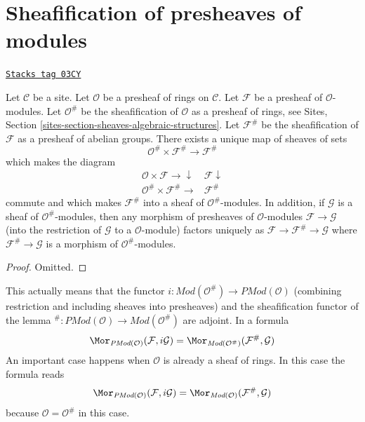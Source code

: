 \section{Sheafification of presheaves of modules}
\label{sites-modules-section-sheafification-presheaves-modules}
\begin{lemma}
\label{sites-modules-lemma-sheafification-presheaf-modules}
\href{https://stacks.math.columbia.edu/tag/03CY}{\texttt{Stacks tag 03CY}}

Let $\mathcal{C}$ be a site.
Let $\mathcal{O}$ be a presheaf of rings on $\mathcal{C}$.
Let $\mathcal{F}$ be a presheaf of $\mathcal{O}$-modules.
Let $\mathcal{O}^\#$ be the sheafification of $\mathcal{O}$ as a presheaf
of rings, see Sites, Section \ref{sites-section-sheaves-algebraic-structures}.
Let $\mathcal{F}^\#$ be the sheafification of $\mathcal{F}$
as a presheaf of abelian groups. There exists a unique map of
sheaves of sets
$$
\mathcal{O}^\# \times \mathcal{F}^\#
\longrightarrow
\mathcal{F}^\#
$$
which makes the diagram
$$
\begin{array}{cc}\mathcal{O} \times \mathcal{F} \longrightarrow\downarrow & \mathcal{F} \downarrow \\ \mathcal{O}^\# \times \mathcal{F}^\# \longrightarrow & \mathcal{F}^\#\end{array}
$$
commute and which makes $\mathcal{F}^\#$ into a sheaf
of $\mathcal{O}^\#$-modules. In addition, if $\mathcal{G}$
is a sheaf of $\mathcal{O}^\#$-modules, then any morphism
of presheaves of $\mathcal{O}$-modules $\mathcal{F} \to \mathcal{G}$
(into the restriction of $\mathcal{G}$ to a $\mathcal{O}$-module)
factors uniquely as $\mathcal{F} \to \mathcal{F}^\# \to \mathcal{G}$
where $\mathcal{F}^\# \to \mathcal{G}$ is a morphism of
$\mathcal{O}^\#$-modules.
\end{lemma}

\begin{proof}
Omitted.
\end{proof}

This actually means that the functor
$i : \textit{Mod}(\mathcal{O}^\#) \to \textit{PMod}(\mathcal{O})$
(combining restriction and including sheaves into presheaves)
and the sheafification functor of the lemma
${}^\# : \textit{PMod}(\mathcal{O}) \to \textit{Mod}(\mathcal{O}^\#)$
are adjoint. In a formula
$$
\Mor_{\textit{PMod}(\mathcal{O})}(\mathcal{F}, i\mathcal{G})
=
\Mor_{\textit{Mod}(\mathcal{O}^\#)}(\mathcal{F}^\#, \mathcal{G})
$$
An important case happens when $\mathcal{O}$ is already a sheaf of
rings. In this case the formula reads
$$
\Mor_{\textit{PMod}(\mathcal{O})}(\mathcal{F}, i\mathcal{G})
=
\Mor_{\textit{Mod}(\mathcal{O})}(\mathcal{F}^\#, \mathcal{G})
$$
because $\mathcal{O} = \mathcal{O}^\#$ in this case.

